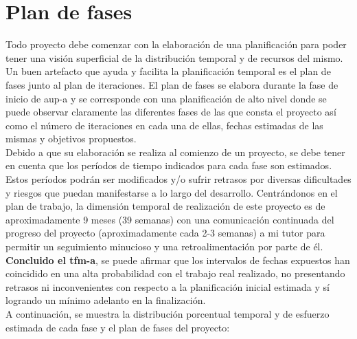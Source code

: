 \documentclass[12pt,a4paper, twoside]{report}
\begin{document}
	\section{Plan de fases} \label{phases}
	
	Todo proyecto debe comenzar con la elaboración de una planificación para poder tener una visión superficial de la distribución temporal y de recursos del mismo. Un buen artefacto que ayuda y facilita la planificación temporal es el plan de fases junto al plan de iteraciones. El plan de fases se elabora durante la fase de inicio de \gls{aup-a} y se corresponde con una planificación de alto nivel donde se puede observar claramente las diferentes fases de las que consta el proyecto así como el número de iteraciones en cada una de ellas, fechas estimadas de las mismas y objetivos propuestos. \\
	
	Debido a que su elaboración se realiza al comienzo de un proyecto, se debe tener en cuenta que los períodos de tiempo indicados para cada fase son estimados. Estos períodos podrán ser modificados y/o sufrir retrasos por diversas dificultades y riesgos que puedan manifestarse a lo largo del desarrollo. Centrándonos en el plan de trabajo, la dimensión temporal de realización de este proyecto es de aproximadamente 9 meses (39 semanas) con una comunicación continuada del progreso del proyecto (aproximadamente cada 2-3 semanas) a mi tutor para permitir un seguimiento minucioso y una retroalimentación por parte de él. \\
	
	\textbf{Concluido el \gls{tfm-a}}, se puede afirmar que los intervalos de fechas expuestos han coincidido en una alta probabilidad con el trabajo real realizado, no presentando retrasos ni inconvenientes con respecto a la planificación inicial estimada y sí logrando un mínimo adelanto en la finalización.\\
			
	A continuación, se muestra la distribución porcentual temporal y de esfuerzo estimada de cada fase y el plan de fases del proyecto: \\
		
\end{document}
